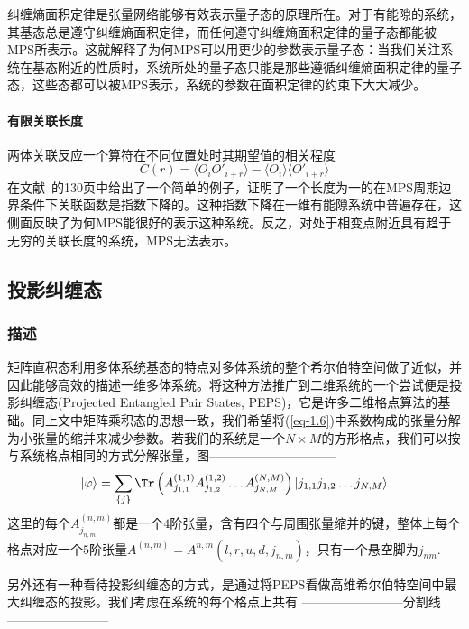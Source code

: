 纠缠熵面积定律是张量网络能够有效表示量子态的原理所在。对于有能隙的系统，其基态总是遵守纠缠熵面积定律，而任何遵守纠缠熵面积定律的量子态都能被MPS所表示\cite{eisertEntanglementTensorNetwork2013}。这就解释了为何MPS可以用更少的参数表示量子态：当我们关注系统在基态附近的性质时，系统所处的量子态只能是那些遵循纠缠熵面积定律的量子态，这些态都可以被MPS表示，系统的参数在面积定律的约束下大大减少。

\paragraph{有限关联长度}

两体关联反应一个算符在不同位置处时其期望值的相关程度
\begin{equation}
C(r) = \langle O_i O'_{i+r}\rangle - \langle O_i\rangle\langle O'_{i+r}\rangle
\end{equation}
在文献~的130页中给出了一个简单的例子，证明了一个长度为一的在MPS周期边界条件下关联函数是指数下降的。这种指数下降在一维有能隙系统中普遍存在，这侧面反映了为何MPS能很好的表示这种系统。反之，对处于相变点附近具有趋于无穷的关联长度的系统，MPS无法表示。


\subsection{投影纠缠态}
\subsubsection{描述}

矩阵直积态利用多体系统基态的特点对多体系统的整个希尔伯特空间做了近似，并因此能够高效的描述一维多体系统。将这种方法推广到二维系统的一个尝试便是投影纠缠态(Projected Entangled Pair States, PEPS)，它是许多二维格点算法的基础。同上文中矩阵乘积态的思想一致，我们希望将(\ref{eq-1.6})中系数构成的张量分解为小张量的缩并来减少参数。若我们的系统是一个$N\times M$的方形格点，我们可以按与系统格点相同的方式分解张量，图——————————
\begin{equation}\label{PEPS_PBC}
\ket{\varphi} = \sum_{\{j\}} \Tr\left( A^{(1,1)}_{j_{1,1}} A^{(1,2)}_{j_{1,2}}\dots A^{(N,M)}_{j_{N,M}} \right)\ket{j_{1,1} j_{1,2}\dots j_{N,M}}
\end{equation}
这里的每个$A^{(n,m)}_{j_{n,m}}$都是一个$4$阶张量，含有四个与周围张量缩并的键，整体上每个格点对应一个$5$阶张量$A^{(n,m)} = A^{n,m}(l,r,u,d,j_{n,m})$，只有一个悬空脚为$j_{nm}$.

另外还有一种看待投影纠缠态的方式，是通过将PEPS看做高维希尔伯特空间中最大纠缠态的投影。我们考虑在系统的每个格点上共有
------------------------分割线------------------------
